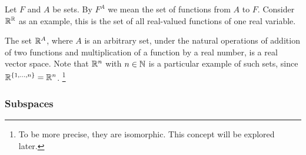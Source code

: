 \begin{notation}
	Let $F$ and $A$ be sets. By $F^A$ we mean the set of functions from $A$ to $F$. Consider $\mathbb{R}^{\mathbb{R}}$ as an example, this is the set of all real-valued functions of one real variable.
\end{notation}

\begin{example}
	The set $\mathbb{R}^A$, where $A$ is an arbitrary set, under the natural operations of addition of two functions and multiplication of a function by a real number, is a real vector space. Note that $\mathbb{R}^n$ with $n \in \mathbb{N}$ is a particular example of such sets, since $\mathbb{R}^{ \{ 1, \ldots, n \} } = \mathbb{R}^n$. \footnote{To be more precise, they are isomorphic. This concept will be explored later.}	
\end{example}
\subsubsection{Subspaces}
